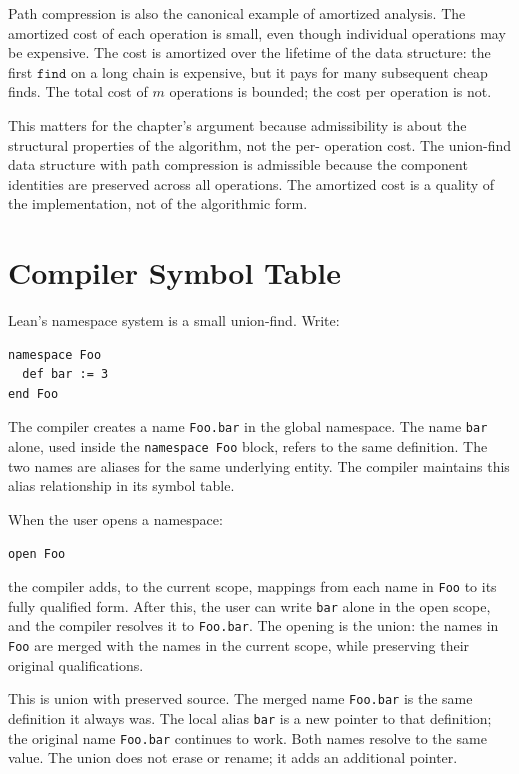 Path compression is also the canonical example of amortized
analysis. The amortized cost of each operation is small, even
though individual operations may be expensive. The cost is amortized
over the lifetime of the data structure: the first $\texttt{find}$
on a long chain is expensive, but it pays for many subsequent
cheap finds. The total cost of $m$ operations is bounded; the cost
per operation is not.

This matters for the chapter's argument because admissibility is
about the structural properties of the algorithm, not the per-
operation cost. The union-find data structure with path compression
is admissible because the component identities are preserved across
all operations. The amortized cost is a quality of the
implementation, not of the algorithmic form.

\section{Compiler Symbol Table}
\label{se:compiler-symbol-table}

Lean's namespace system is a small union-find. Write:
\begin{verbatim}
namespace Foo
  def bar := 3
end Foo
\end{verbatim}
The compiler creates a name \texttt{Foo.bar} in the global namespace.
The name \texttt{bar} alone, used inside the \texttt{namespace Foo}
block, refers to the same definition. The two names are aliases for
the same underlying entity. The compiler maintains this alias
relationship in its symbol table.

When the user opens a namespace:
\begin{verbatim}
open Foo
\end{verbatim}
the compiler adds, to the current scope, mappings from each name in
\texttt{Foo} to its fully qualified form. After this, the user can
write \texttt{bar} alone in the open scope, and the compiler resolves
it to \texttt{Foo.bar}. The opening is the union: the names in
\texttt{Foo} are merged with the names in the current scope, while
preserving their original qualifications.

This is union with preserved source. The merged name \texttt{Foo.bar}
is the same definition it always was. The local alias \texttt{bar} is
a new pointer to that definition; the original name \texttt{Foo.bar}
continues to work. Both names resolve to the same value. The union
does not erase or rename; it adds an additional pointer.

